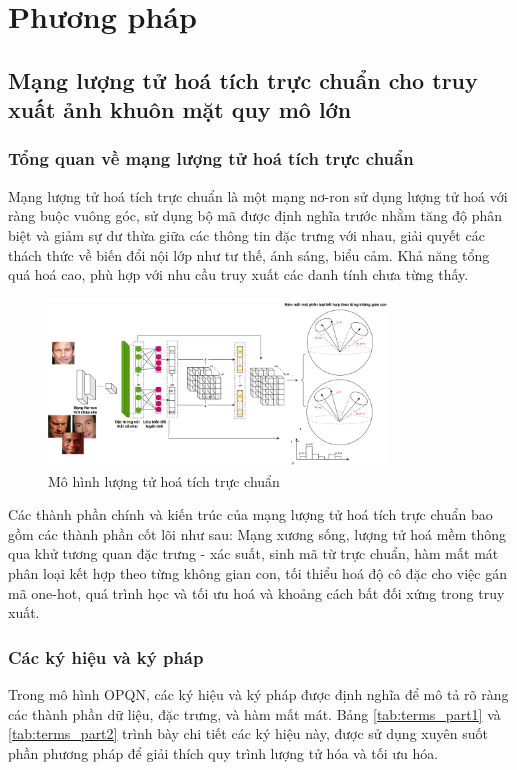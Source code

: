 \chapter{Phương pháp}
\label{Chapter3}

\section{Mạng lượng tử hoá tích trực chuẩn cho truy xuất ảnh khuôn mặt quy mô lớn}
\subsection{Tổng quan về mạng lượng tử hoá tích trực chuẩn}
Mạng lượng tử hoá tích trực chuẩn là một mạng nơ-ron sử dụng lượng tử hoá với ràng buộc vuông góc, sử dụng bộ mã được định nghĩa trước nhằm tăng độ phân biệt và giảm sự dư thừa giữa các thông tin đặc trưng với nhau, giải quyết các thách thức về biến đổi nội lớp như tư thế, ánh sáng, biểu cảm. Khả năng tổng quá hoá cao, phù hợp với nhu cầu truy xuất các danh tính chưa từng thấy.

\begin{figure}[htbp] %
    \centering
    \includegraphics[width=0.8\textwidth]{images/opqn_model.png} 
    \caption{Mô hình lượng tử hoá tích trực chuẩn}
    \label{fig:opqn_rmodel_types}
\end{figure}

Các thành phần chính và kiến trúc của mạng lượng tử hoá tích trực chuẩn bao gồm các thành phần cốt lõi như sau: Mạng xương sống, lượng tử hoá mềm thông qua khử tương quan đặc trưng - xác suất, sinh mã từ trực chuẩn, hàm mất mát phân loại kết hợp theo từng không gian con, tối thiểu hoá độ cô đặc cho việc gán mã one-hot, quá trình học và tối ưu hoá và khoảng cách bất đối xứng trong truy xuất.
\subsection{Các ký hiệu và ký pháp}
Trong mô hình OPQN, các ký hiệu và ký pháp được định nghĩa để mô tả rõ ràng các thành phần dữ liệu, đặc trưng, và hàm mất mát. Bảng \ref{tab:terms_part1} và \ref{tab:terms_part2} trình bày chi tiết các ký hiệu này, được sử dụng xuyên suốt phần phương pháp để giải thích quy trình lượng tử hóa và tối ưu hóa.

